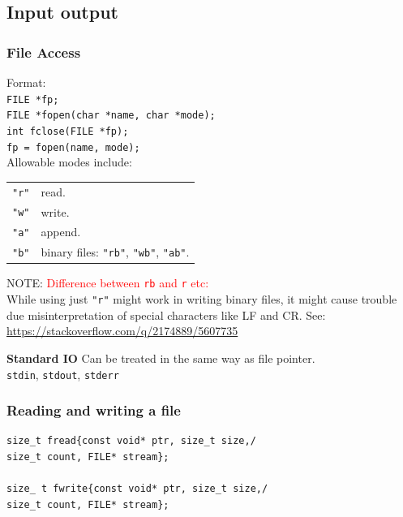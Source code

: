 \subsection{Input output}

\subsubsection{File Access}

Format:\\

\texttt{FILE *fp;}\\
\texttt{FILE *fopen(char *name, char *mode);}\\
\texttt{int fclose(FILE *fp);}\\
\texttt{fp = fopen(name, mode);}\\

Allowable modes include:\\
\begin{tabularx}{\linewidth}{lX}
\texttt{"r"} & read.\\
\texttt{"w"} & write.\\
\texttt{"a"} & append.\\
\texttt{"b"} & binary files: \texttt{"rb"}, \texttt{"wb"}, \texttt{"ab"}.\\
\end{tabularx}
NOTE: \textcolor{red}{Difference between \texttt{rb} and \texttt{r} etc:}\\
While using just \texttt{"r"} might work in writing binary files, it might cause trouble due misinterpretation of special characters like LF and CR. See: \url{https://stackoverflow.com/q/2174889/5607735} 

\textbf{Standard IO}
Can be treated in the same way as file pointer.\\
\texttt{stdin}, \texttt{stdout}, \texttt{stderr}\\

\subsubsection{Reading and writing a file}
\begin{verbatim}
size_t fread{const void* ptr, size_t size,/
size_t count, FILE* stream};

size_ t fwrite{const void* ptr, size_t size,/
size_t count, FILE* stream};
\end{verbatim}


